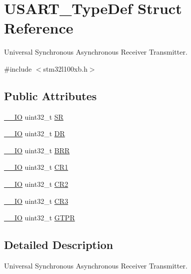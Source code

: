 \hypertarget{struct_u_s_a_r_t___type_def}{\section{U\-S\-A\-R\-T\-\_\-\-Type\-Def Struct Reference}
\label{struct_u_s_a_r_t___type_def}
}


Universal Synchronous Asynchronous Receiver Transmitter.  




{\ttfamily \#include $<$stm32l100xb.\-h$>$}

\subsection*{Public Attributes}
\begin{DoxyCompactItemize}
\item 
\hyperlink{core__sc300_8h_aec43007d9998a0a0e01faede4133d6be}{\-\_\-\-\_\-\-I\-O} uint32\-\_\-t \hyperlink{struct_u_s_a_r_t___type_def_a706005f59139b9ff8ee5755677e12bc7}{S\-R}
\item 
\hyperlink{core__sc300_8h_aec43007d9998a0a0e01faede4133d6be}{\-\_\-\-\_\-\-I\-O} uint32\-\_\-t \hyperlink{struct_u_s_a_r_t___type_def_a1db25b74d47af33dc4f4fe2177fc5da0}{D\-R}
\item 
\hyperlink{core__sc300_8h_aec43007d9998a0a0e01faede4133d6be}{\-\_\-\-\_\-\-I\-O} uint32\-\_\-t \hyperlink{struct_u_s_a_r_t___type_def_a6ef06ba9d8dc2dc2a0855766369fa7c9}{B\-R\-R}
\item 
\hyperlink{core__sc300_8h_aec43007d9998a0a0e01faede4133d6be}{\-\_\-\-\_\-\-I\-O} uint32\-\_\-t \hyperlink{struct_u_s_a_r_t___type_def_a6d7dcd3972a162627bc3470cbf992ec4}{C\-R1}
\item 
\hyperlink{core__sc300_8h_aec43007d9998a0a0e01faede4133d6be}{\-\_\-\-\_\-\-I\-O} uint32\-\_\-t \hyperlink{struct_u_s_a_r_t___type_def_aa7ede2de6204c3fc4bd9fb328801c99a}{C\-R2}
\item 
\hyperlink{core__sc300_8h_aec43007d9998a0a0e01faede4133d6be}{\-\_\-\-\_\-\-I\-O} uint32\-\_\-t \hyperlink{struct_u_s_a_r_t___type_def_af2991da9a4e1539530cd6b7b327199cc}{C\-R3}
\item 
\hyperlink{core__sc300_8h_aec43007d9998a0a0e01faede4133d6be}{\-\_\-\-\_\-\-I\-O} uint32\-\_\-t \hyperlink{struct_u_s_a_r_t___type_def_ae23acff49b4ff96fd29093e80fc7d72e}{G\-T\-P\-R}
\end{DoxyCompactItemize}


\subsection{Detailed Description}
Universal Synchronous Asynchronous Receiver Transmitter. 

